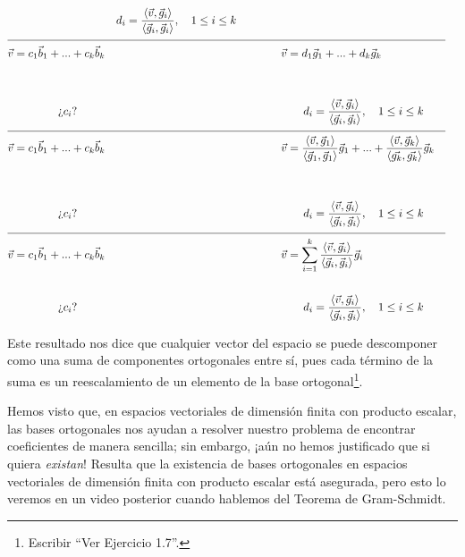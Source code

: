\documentclass[12pt,dvipsnames]{article}
\numberwithin{equation}{section}
\begin{document}
\begin{align*}
    & &d_i = \frac{\langle \vec{v} ,\vec{g}_i \rangle}{\langle\vec{g}_i, \vec{g}_i\rangle}, \quad 1\le i\le k
    \\
    \cline{1-8}
    \vec{v}&= c_1\vec{b}_1 + ... + c_k\vec{b}_k& &\quad \quad \quad \quad \vec{v}= d_1\vec{g}_1 + ... + d_k\vec{g}_k& & & \\
    \\
    \\
           &\quad \quad \quad \quad \text{¿}c_i\text{?}& &\quad \quad \quad \quad \quad \quad d_i = \frac{\langle \vec{v} ,\vec{g}_i \rangle}{\langle\vec{g}_i, \vec{g}_i\rangle}, \quad 1\le i\le k& & &
    \\
    \cline{1-8}
    \vec{v}&= c_1\vec{b}_1 + ... + c_k\vec{b}_k& &\quad \quad \quad \quad \vec{v}= \frac{\langle \vec{v} , \vec{g}_1 \rangle}{\langle \vec{g}_1 , \vec{g}_1 \rangle}\vec{g}_1 + ... + \frac{\langle \vec{v} , \vec{g}_k \rangle}{\langle \vec{g_k} , \vec{g_k} \rangle}\vec{g}_k& & & \\
    \\
    \\
           &\quad \quad \quad \quad \text{¿}c_i\text{?}& &\quad \quad \quad \quad \quad \quad d_i = \frac{\langle \vec{v} ,\vec{g}_i \rangle}{\langle\vec{g}_i, \vec{g}_i\rangle}, \quad 1\le i\le k& & &
    \\
    \cline{1-8}
    \vec{v}&= c_1\vec{b}_1 + ... + c_k\vec{b}_k& &\quad \quad \quad \quad \vec{v}= \sum_{i=1}^k\frac{\langle \vec{v} , \vec{g}_i \rangle}{\langle \vec{g}_i , \vec{g}_i \rangle}\vec{g}_i & & &
    \\
    \\
           &\quad \quad \quad \quad \text{¿}c_i\text{?}& &\quad \quad \quad \quad \quad \quad d_i = \frac{\langle \vec{v} ,\vec{g}_i \rangle}{\langle\vec{g}_i, \vec{g}_i\rangle}, \quad 1\le i\le k& & &
\end{align*}

Este resultado nos dice que cualquier vector del espacio se puede descomponer como una suma de componentes ortogonales entre sí, pues cada término de la suma es un reescalamiento de un elemento de la base ortogonal\footnote{Escribir ``Ver Ejercicio 1.7''.}.

Hemos visto que, en espacios vectoriales de dimensión finita con producto escalar, las bases ortogonales nos ayudan a resolver nuestro problema de encontrar coeficientes de manera sencilla; sin embargo, ¡aún no hemos justificado que si quiera \emph{existan}! Resulta que la existencia de bases ortogonales en espacios vectoriales de dimensión finita con producto escalar está asegurada, pero esto lo veremos en un video posterior cuando hablemos del Teorema de Gram-Schmidt.
\end{document}

